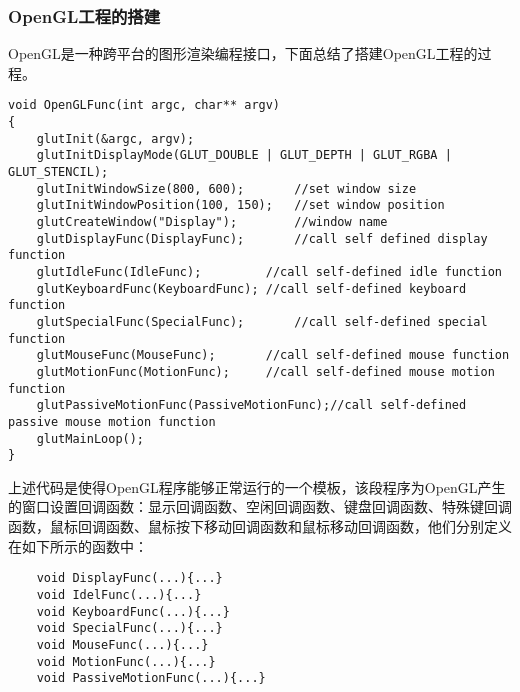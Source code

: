 \documentclass[10pt]{article}
\begin{document}
\subsubsection{OpenGL工程的搭建}
OpenGL是一种跨平台的图形渲染编程接口，下面总结了搭建OpenGL工程的过程。
\begin{lstlisting}
void OpenGLFunc(int argc, char** argv)
{
	glutInit(&argc, argv);
	glutInitDisplayMode(GLUT_DOUBLE | GLUT_DEPTH | GLUT_RGBA | GLUT_STENCIL);
	glutInitWindowSize(800, 600);		//set window size
	glutInitWindowPosition(100, 150);	//set window position
	glutCreateWindow("Display");		//window name
	glutDisplayFunc(DisplayFunc);		//call self defined display function
	glutIdleFunc(IdleFunc);			//call self-defined idle function
	glutKeyboardFunc(KeyboardFunc);	//call self-defined keyboard function
	glutSpecialFunc(SpecialFunc);		//call self-defined special function
	glutMouseFunc(MouseFunc);		//call self-defined mouse function
	glutMotionFunc(MotionFunc);		//call self-defined mouse motion function
	glutPassiveMotionFunc(PassiveMotionFunc);//call self-defined passive mouse motion function
	glutMainLoop();
}
\end{lstlisting}

上述代码是使得OpenGL程序能够正常运行的一个模板，该段程序为OpenGL产生的窗口设置回调函数：显示回调函数、空闲回调函数、键盘回调函数、特殊键回调函数，鼠标回调函数、鼠标按下移动回调函数和鼠标移动回调函数，他们分别定义在如下所示的函数中：
\begin{lstlisting}
	void DisplayFunc(...){...}
	void IdelFunc(...){...}
	void KeyboardFunc(...){...}
	void SpecialFunc(...){...}
	void MouseFunc(...){...}
	void MotionFunc(...){...}
	void PassiveMotionFunc(...){...}
\end{lstlisting}
\end{document}
